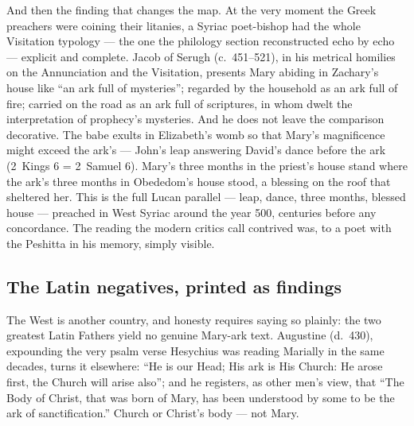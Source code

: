 And then the finding that changes the map. At the very moment the
Greek preachers were coining their litanies, a Syriac poet-bishop had
the whole Visitation typology --- the one the philology section
reconstructed echo by echo --- explicit and complete. Jacob of Serugh
(c.~451--521), in his metrical homilies on the Annunciation and the
Visitation, presents Mary abiding in Zachary's house like ``an ark
full of mysteries''; regarded by the household as an ark full of fire;
carried on the road as an ark full of scriptures, in whom dwelt the
interpretation of prophecy's mysteries. And he does not leave the
comparison decorative. The babe exults in Elizabeth's womb so that
Mary's magnificence might exceed the ark's --- John's leap answering
David's dance before the ark (2~Kings 6 = 2~Samuel 6). Mary's
three months in the priest's house stand where the ark's three months
in Obededom's house stood, a blessing on the roof that sheltered
her. This is
the full Lucan parallel --- leap, dance, three months, blessed house
--- preached in West Syriac around the year 500, centuries before any
concordance. The reading the modern critics call contrived was, to a
poet with the Peshitta in his memory, simply visible.

\subsection{The Latin negatives, printed as findings}

The West is another country, and honesty requires saying so plainly:
the two greatest Latin Fathers yield no genuine Mary-ark text.
Augustine (d.~430), expounding the very psalm verse Hesychius was
reading Marially in the same decades, turns it elsewhere: ``He is our
Head; His ark is His Church: He arose first, the Church will arise
also''; and he registers, as other men's view, that ``The Body of
Christ, that was born of Mary, has been understood by some to be the
ark of sanctification.'' Church or Christ's body --- not Mary.

